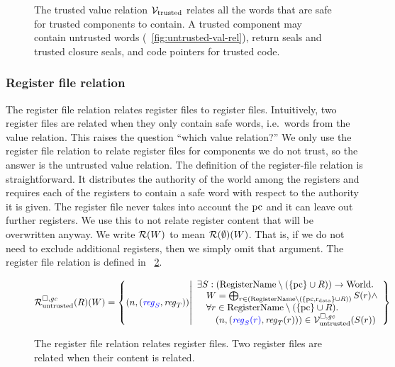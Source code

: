 \begin{jversion}
\begin{figure}
\caption{The trusted value relation $\mathcal{V}_{\mathrm{trusted}}$ relates all the words that are safe for trusted components to contain. A trusted component may contain untrusted words (\figurename~\ref{fig:untrusted-val-rel}), return seals and trusted closure seals, and code pointers for trusted code. }
\label{fig:trusted-val-rel}
\end{figure}
\subsubsection{Register file relation}
The register file relation relates \srccm{} register files to \trgcm{} register files.
Intuitively, two register files are related when they only contain safe words, i.e.\ words from the value relation.
This raises the question ``which value relation?''
We only use the register file relation to relate register files for components we do not trust, so the answer is the untrusted value relation.
The definition of the register-file relation is straightforward.
It distributes the authority of the world among the registers and requires each of the registers to contain a safe word with respect to the authority it is given.
The register file never takes into account the $\mathrm{pc}$ and it can leave out further registers.
We use this to not relate register content that will be overwritten anyway.
We write $\mathcal{R}(W)$ to mean $\mathcal{R}(\emptyset)(W)$.
That is, if we do not need to exclude additional registers, then we simply omit that argument.
The register file relation is defined in \figurename~\ref{fig:reg-file-rel}.

\begin{figure}
  \centering
  \[
  \lrr(R)(W) = \left\{ \npair{\stpair{\reg}{\reg}} \middle|
    \begin{array}{l}
      \exists S : (\RegName \setminus (\{\pcreg \} \cup R))\fun \World \ldotp \\
      \quad W = \bigoplus_{r \in (\RegName\setminus (\{\pcreg,\rdata \} \cup R))} S(r) \wedge \\
      \quad \forall r \in \RegName \setminus (\{\pcreg \} \cup R)\ldotp\\
      \qquad\npair{\stpair[.]{\src{\reg_S(r)}}{\reg_T(r)}} \in \lrv(S(r))
    \end{array}
            \right\}
\]
\caption{The register file relation relates register files. Two register files are related when their content is related.}
\label{fig:reg-file-rel}
\end{figure}


\end{jversion}
